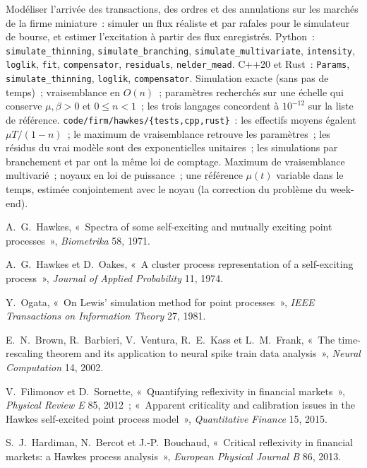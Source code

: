 \begin{build}
 Modéliser l'arrivée des transactions, des ordres et des annulations sur les marchés de la firme miniature~:
simuler un flux réaliste et par rafales pour le simulateur de bourse, et estimer l'excitation
à partir des flux enregistrés.
 Python~: \texttt{simulate\_thinning}, \texttt{simulate\_branching},
\texttt{simulate\_multivariate}, \texttt{intensity}, \texttt{loglik}, \texttt{fit}, \texttt{compensator},
\texttt{residuals}, \texttt{nelder\_mead}. C++20 et Rust~: \texttt{Params}, \texttt{simulate\_thinning},
\texttt{loglik}, \texttt{compensator}.
 Simulation exacte (sans pas de temps)~; vraisemblance en $O(n)$~; paramètres recherchés sur une échelle qui
conserve $\mu, \beta > 0$ et $0 \le n < 1$~; les trois langages concordent à $10^{-12}$ sur la liste de référence.
 \texttt{code/firm/hawkes/\{tests,cpp,rust\}}~: les effectifs moyens égalent $\mu T/(1 - n)$~;
le maximum de vraisemblance retrouve les paramètres~; les résidus du vrai modèle sont des exponentielles unitaires~; les simulations par branchement et
par  ont la même loi de comptage.
 Maximum de vraisemblance multivarié~; noyaux en loi de puissance~; une référence $\mu(t)$ variable dans le temps, estimée
conjointement avec le noyau (la correction du problème du week-end).
\end{build}

\begin{omsources}
\item A.~G.~Hawkes, «~Spectra of some self-exciting and mutually exciting point processes~»,
\emph{Biometrika} 58, 1971.
\item A.~G.~Hawkes et D.~Oakes, «~A cluster process representation of a self-exciting process~»,
\emph{Journal of Applied Probability} 11, 1974.
\item Y.~Ogata, «~On Lewis' simulation method for point processes~», \emph{IEEE Transactions on
Information Theory} 27, 1981.
\item E.~N.~Brown, R.~Barbieri, V.~Ventura, R.~E.~Kass et L.~M.~Frank, «~The time-rescaling theorem and
its application to neural spike train data analysis~», \emph{Neural Computation} 14, 2002.
\item V.~Filimonov et D.~Sornette, «~Quantifying reflexivity in financial markets~», \emph{Physical Review E}
85, 2012~; «~Apparent criticality and calibration issues in the Hawkes self-excited point process model~»,
\emph{Quantitative Finance} 15, 2015.
\item S.~J.~Hardiman, N.~Bercot et J.-P.~Bouchaud, «~Critical reflexivity in financial markets: a Hawkes
process analysis~», \emph{European Physical Journal B} 86, 2013.
\end{omsources}

